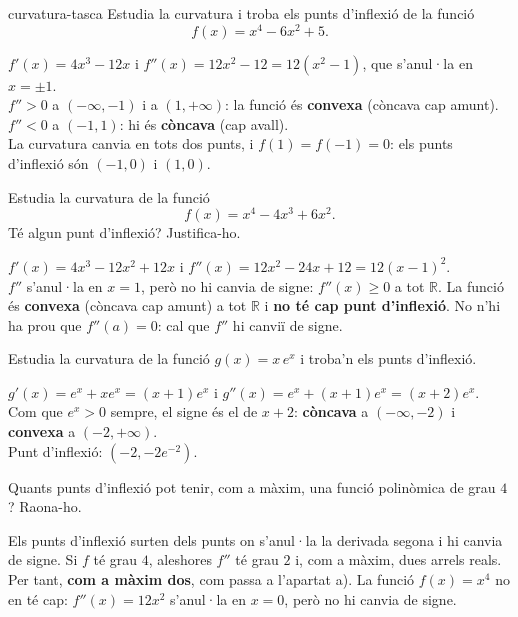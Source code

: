 \begin{apartats}

\begin{tria}{curvatura-tasca}
Estudia la curvatura i troba els punts d'inflexió de la funció
\[
f(x)=x^4-6x^2+5 .
\]

\begin{solucio}
$f'(x)=4x^3-12x$ i $f''(x)=12x^2-12=12\left(x^2-1\right)$, que s'anul·la en $x=\pm1$.\\
$f''>0$ a $(-\infty,-1)$ i a $(1,+\infty)$: la funció és \textbf{convexa} (còncava cap amunt).\\
$f''<0$ a $(-1,1)$: hi és \textbf{còncava} (cap avall).\\
La curvatura canvia en tots dos punts, i $f(1)=f(-1)=0$: els punts d'inflexió són
$\boxed{(-1,0)}$ i $\boxed{(1,0)}$.
\end{solucio}

Estudia la curvatura de la funció
\[
f(x)=x^4-4x^3+6x^2 .
\]
Té algun punt d'inflexió? Justifica-ho.

\begin{solucio}
$f'(x)=4x^3-12x^2+12x$ i $f''(x)=12x^2-24x+12=12(x-1)^2$.\\
$f''$ s'anul·la en $x=1$, però no hi canvia de signe: $f''(x)\ge0$ a tot $\mathbb{R}$. La funció
és \textbf{convexa} (còncava cap amunt) a tot $\mathbb{R}$ i \textbf{no té cap punt d'inflexió}.
No n'hi ha prou que $f''(a)=0$: cal que $f''$ hi canviï de signe.
\end{solucio}
\end{tria}

\begin{nomesllarg}
Estudia la curvatura de la funció $g(x)=x\,e^{x}$ i troba'n els punts d'inflexió.

\begin{solucio}
$g'(x)=e^{x}+x e^{x}=(x+1)e^{x}$ i $g''(x)=e^{x}+(x+1)e^{x}=(x+2)e^{x}$.\\
Com que $e^{x}>0$ sempre, el signe és el de $x+2$: \textbf{còncava} a $(-\infty,-2)$ i
\textbf{convexa} a $(-2,+\infty)$.\\
Punt d'inflexió: $\left(-2,-2e^{-2}\right)$.
\end{solucio}
\end{nomesllarg}

Quants punts d'inflexió pot tenir, com a màxim, una funció polinòmica de grau $4$? Raona-ho.

\begin{solucio}
Els punts d'inflexió surten dels punts on s'anul·la la derivada segona i hi canvia de signe.
Si $f$ té grau $4$, aleshores $f''$ té grau $2$ i, com a màxim, dues arrels reals.\\
Per tant, \textbf{com a màxim dos}, com passa a l'apartat a). La funció $f(x)=x^4$ no en té
cap: $f''(x)=12x^2$ s'anul·la en $x=0$, però no hi canvia de signe.
\end{solucio}

\end{apartats}
